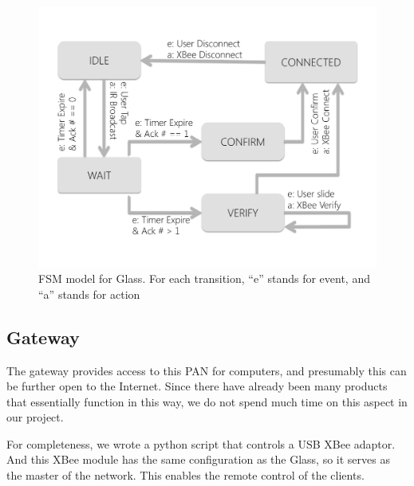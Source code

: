 \begin{figure}
  \centering
  \includegraphics[width=\linewidth]{../figs/glassFSM.pdf}
  \caption{FSM model for Glass. For each transition, ``e'' stands for event, and ``a'' stands for action}
  \label{fig:glassFSM}
\end{figure}

\subsection{Gateway}
\label{sec:gateway}

The gateway provides access to this PAN for computers, and presumably this can be further open to the Internet. Since there have already been many products \cite{NinjaBlocks, Lockitron} that essentially function in this way, we do not spend much time on this aspect in our project. 

For completeness, we wrote a python script that controls a USB XBee adaptor. And this XBee module has the same configuration as the Glass, so it serves as the master of the network. This enables the remote control of the clients.


